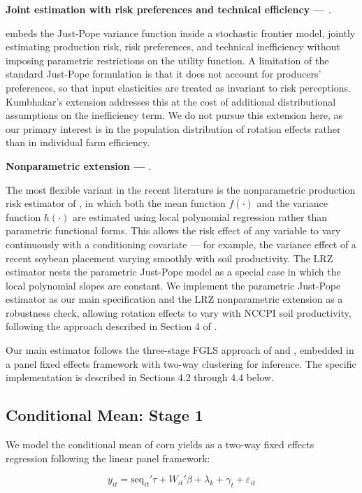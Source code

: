 \documentclass[11pt,letterpaper]{article}
\theoremstyle{remark}
\theoremstyle{plain}
\theoremstyle{definition}
\begin{document}
\textbf{Joint estimation with risk preferences and technical efficiency — \cite{Kumbhakar2002}}.

\cite{Kumbhakar2002} embeds the Just-Pope variance function inside a stochastic frontier model, jointly estimating production risk, risk preferences, and technical inefficiency without imposing parametric restrictions on the utility function. A limitation of the standard Just-Pope formulation is that it does not account for producers'  preferences, so that input elasticities are treated as invariant to risk perceptions. Kumbhakar's extension addresses this at the cost of additional distributional assumptions on the inefficiency term. We do not pursue this extension here, as our primary interest is in the population distribution of rotation effects rather than in individual farm efficiency.

\textbf{Nonparametric extension — \cite{li2021}}. 

The most flexible variant in the recent literature is the nonparametric production risk estimator of \cite{li2021}, in which both the mean function $f(\cdot)$ and the variance function $h(\cdot)$ are estimated using local polynomial regression rather than parametric functional forms. This allows the risk effect of any variable to vary continuously with a conditioning covariate — for example, the variance effect of a recent soybean placement varying smoothly with soil productivity. The LRZ estimator nests the parametric Just-Pope model as a special case in which the local polynomial slopes are constant. We implement the parametric Just-Pope estimator as our main specification and the LRZ nonparametric extension as a robustness check, allowing rotation effects to vary with NCCPI soil productivity, following the approach described in Section 4 of \cite{li2021}.

Our main estimator follows the three-stage FGLS approach of \cite{Harvey1976} and \cite{Saha1997}, embedded in a panel fixed effects framework with two-way clustering for inference. The specific implementation is described in Sections 4.2 through 4.4 below.

\subsection{\label{subsec:stage_1}Conditional Mean: Stage 1}
We model the conditional mean of corn yields as a two-way fixed effects regression following the linear panel framework:

\begin{equation}
    y_{it}=\text{seq}_{it}'\tau+ W_{it}'\beta+\lambda_{k}+\gamma_{t}+\varepsilon_{it}
\end{equation}
\end{document}
